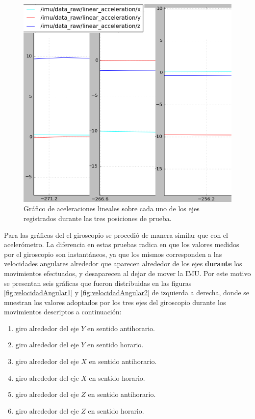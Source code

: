 \begin{figure}[ht]
    \centering
    \includegraphics[scale=0.4]{./Figures/linear_acceleration.png}
    \caption{Gráfico de aceleraciones lineales sobre cada uno de los ejes registrados durante las tres posiciones de prueba.}
    \label{fig:aceleracionLineal}
\end{figure}


Para las gráficas del el giroscopio se procedió de manera similar que con el acelerómetro. La diferencia en estas pruebas radica en que los valores medidos por el giroscopio son instantáneos, ya que los mismos corresponden a las velocidades angulares alrededor que aparecen alrededor de los ejes \textbf{durante} los movimientos efectuados, y desaparecen al dejar de mover la IMU. Por este motivo se presentan seis gráficas que fueron distribuidas en las figuras \ref{fig:velocidadAngular1} y \ref{fig:velocidadAngular2} de izquierda a derecha, donde se muestran los valores adoptados por los tres ejes del giroscopio durante los movimientos descriptos a continuación:

\begin{enumerate}
    \item giro alrededor del eje $Y$ en sentido antihorario.
    \item giro alrededor del eje $Y$ en sentido horario.
    \item giro alrededor del eje $X$ en sentido antihorario.
    \item giro alrededor del eje $X$ en sentido horario.
    \item giro alrededor del eje $Z$ en sentido antihorario.
    \item giro alrededor del eje $Z$ en sentido horario.
\end{enumerate}

